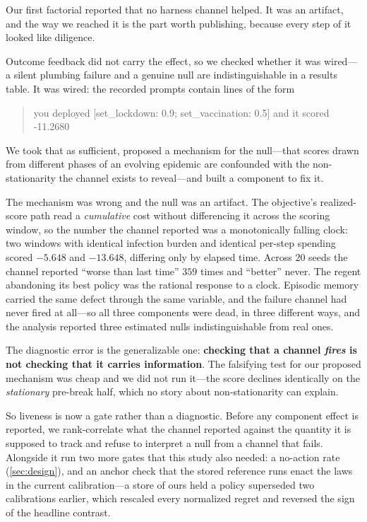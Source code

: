 \documentclass[11pt]{article}
\begin{document}
Our first factorial reported that no harness channel helped. It was an artifact, and the way we
reached it is the part worth publishing, because every step of it looked like diligence.

Outcome feedback did not carry the effect, so we checked whether it was wired---a silent plumbing
failure and a genuine null are indistinguishable in a results table. It was wired: the recorded
prompts contain lines of the form
\begin{quote}\ttfamily\small
you deployed [set\_lockdown: 0.9; set\_vaccination: 0.5] and it scored -11.2680
\end{quote}
We took that as sufficient, proposed a mechanism for the null---that scores drawn from different
phases of an evolving epidemic are confounded with the non-stationarity the channel exists to
reveal---and built a component to fix it.

The mechanism was wrong and the null was an artifact. The objective's realized-score path read a
\emph{cumulative} cost without differencing it across the scoring window, so the number the channel
reported was a monotonically falling clock: two windows with identical infection burden and
identical per-step spending scored $-5.648$ and $-13.648$, differing only by elapsed time. Across
$20$ seeds the channel reported ``worse than last time'' $359$ times and ``better'' never. The
regent abandoning its best policy was the rational response to a clock. Episodic memory carried the
same defect through the same variable, and the failure channel had never fired at all---so all three
components were dead, in three different ways, and the analysis reported three estimated nulls
indistinguishable from real ones.

The diagnostic error is the generalizable one: \textbf{checking that a channel \emph{fires} is not
checking that it carries information}. The falsifying test for our proposed mechanism was cheap and
we did not run it---the score declines identically on the \emph{stationary} pre-break half, which no
story about non-stationarity can explain.

So liveness is now a gate rather than a diagnostic. Before any component effect is reported, we
rank-correlate what the channel reported against the quantity it is supposed to track and refuse to
interpret a null from a channel that fails. Alongside it run two more gates that this study also
needed: a no-action rate (\cref{sec:design}), and an anchor check that the stored reference runs
enact the laws in the current calibration---a store of ours held a policy superseded two
calibrations earlier, which rescaled every normalized regret and reversed the sign of the headline
contrast.
\end{document}
